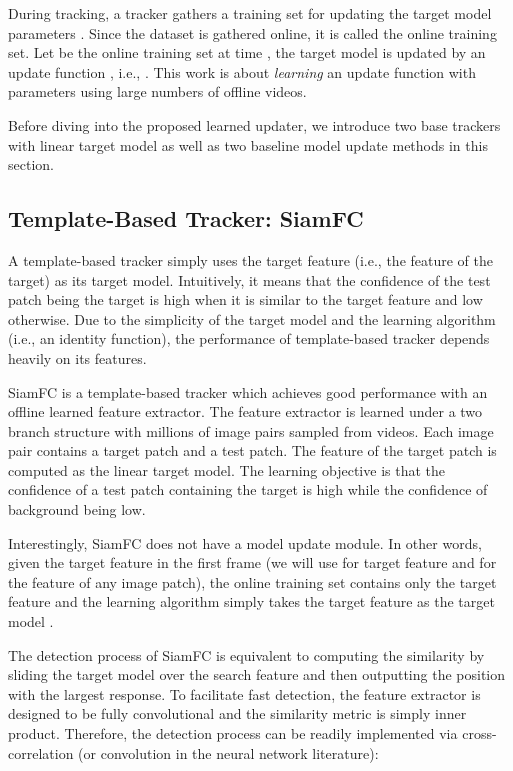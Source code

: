 \documentclass[journal]{IEEEtran}
\begin{document}
During tracking, a tracker gathers a training set  for updating the target model parameters . Since the dataset is gathered online, it is called the online training set. Let  be the online training set at time , the target model is updated by an update function , i.e., . This work is about \emph{learning} an update function  with parameters  using large numbers of offline videos.

Before diving into the proposed learned updater, we introduce two base trackers with linear target model as well as two baseline model update methods in this section. 

\subsection{Template-Based Tracker: SiamFC}
A template-based tracker simply uses the target feature (i.e., the feature of the target) as its target model. Intuitively, it means that the confidence of the test patch being the target is high when it is similar to the target feature and low otherwise. Due to the simplicity of the target model and the learning algorithm (i.e., an identity function), the performance of template-based tracker depends heavily on its features. 

SiamFC\cite{bertinetto2016fully} is a template-based tracker which achieves good performance with an offline learned feature extractor. The feature extractor is learned under a two branch structure with millions of image pairs sampled from videos. Each image pair contains a target patch and a test patch. The feature of the target patch is computed as the linear target model. The learning objective is that the confidence of a test patch containing the target is high while the confidence of background being low.

Interestingly, SiamFC does not have a model update module. In other words, given the target feature in the first frame  (we will use  for target feature and  for the feature of any image patch), the online training set contains only the target feature  and the learning algorithm simply takes the target feature as the target model . 

The detection process of SiamFC is equivalent to computing the similarity by sliding the target model  over the search feature  and then outputting the position with the largest response. To facilitate fast detection, the feature extractor is designed to be fully convolutional and the similarity metric is simply inner product. Therefore, the detection process can be readily implemented via cross-correlation  (or convolution in the neural network literature):
  
\end{document}

